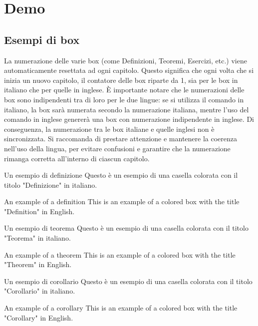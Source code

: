 \chapter{Demo}
\section{Esempi di box}

La numerazione delle varie box (come Definizioni, Teoremi, Esercizi, etc.) viene automaticamente resettata ad ogni capitolo. Questo significa che ogni volta che si inizia un nuovo capitolo, il contatore delle box riparte da 1, sia per le box in italiano che per quelle in inglese. È importante notare che le numerazioni delle box sono indipendenti tra di loro per le due lingue: se si utilizza il comando in italiano, la box sarà numerata secondo la numerazione italiana, mentre l'uso del comando in inglese genererà una box con numerazione indipendente in inglese. Di conseguenza, la numerazione tra le box italiane e quelle inglesi non è sincronizzata. Si raccomanda di prestare attenzione e mantenere la coerenza nell'uso della lingua, per evitare confusioni e garantire che la numerazione rimanga corretta all'interno di ciascun capitolo.

\begin{definizione}{Un esempio di definizione}
  Questo è un esempio di una casella colorata con il titolo "Definizione" in italiano.
\end{definizione}

\begin{definition}{An example of a definition}
  This is an example of a colored box with the title "Definition" in English.
\end{definition}

\begin{teorema}{Un esempio di teorema}
  Questo è un esempio di una casella colorata con il titolo "Teorema" in italiano.
\end{teorema}

\begin{theorem}{An example of a theorem}
  This is an example of a colored box with the title "Theorem" in English.
\end{theorem}

\begin{corollario}{Un esempio di corollario}
  Questo è un esempio di una casella colorata con il titolo "Corollario" in italiano.
\end{corollario}

\begin{corollary}{An example of a corollary}
  This is an example of a colored box with the title "Corollary" in English.
\end{corollary}

